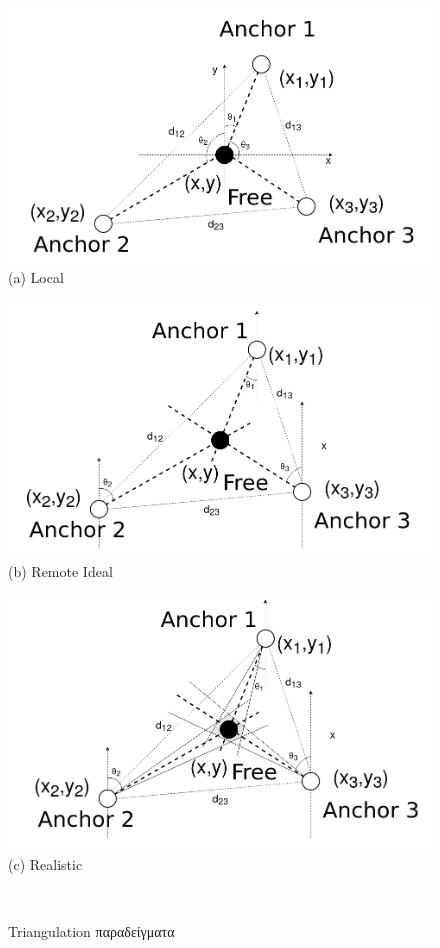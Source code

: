 \begin{figure} [H]
	\centering
	\hspace*{+2cm}\begin{minipage}{0.4\textwidth}
		\centering
		\includegraphics[width=0.8\linewidth]{../Photos/Tringulation-local.png}\\
		{(a) Local}
	\end{minipage}
	\newline
	\hspace*{+1cm}\begin{minipage}{.4\textwidth}
		\centering
		\includegraphics[width=.8\linewidth]{../Photos/Tringulation-remote.png}\\
		{(b) Remote Ideal}
	\end{minipage}%
	\begin{minipage}{.4\textwidth}
		\centering
		\includegraphics[width=.8\linewidth]{../Photos/Tringulation-remote-actual.png}\\
		{(c) Realistic}
	\end{minipage}
	\hfill \break \\
	\decoRule
	\caption[Triangulation παραδείγματα]{Triangulation παραδείγματα} %
	\label{fig:Triangulation-examples}
\end{figure}

